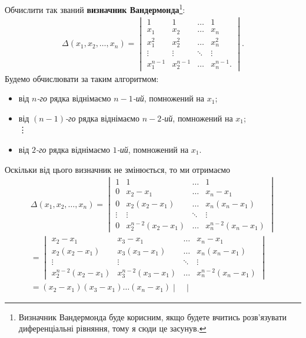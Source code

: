 \documentclass{math_library}
\begin{document}
\begin{example}
Обчислити так званий \textbf{визначник Вандермонда}\footnote{Визначник Вандермонда буде корисним, якщо будете вчитись розв'язувати диференціальні рівняння, тому я сюди це засунув.}:
\begin{align*}
\Delta (x_1,x_2,\dots,x_n) = \begin{vmatrix}
1 & 1 & \dots & 1 \\
x_1 & x_2 & \dots & x_n \\
x_1^2 & x_2^2 & \dots & x_n^2 \\
\vdots & \vdots & \ddots & \vdots \\
x_1^{n-1} & x_2^{n-1} & \dots & x_n^{n-1}.
\end{vmatrix}.
\end{align*}
Будемо обчислювати за таким алгоритмом:
\begin{itemize}[nosep,wide=0pt,label={--}]
\item від $n$\textit{-го} рядка віднімаємо $n-1$\textit{-ий}, помножений на $x_1$;
\item від $(n-1)$\textit{-го} рядка віднімаємо $n-2$\textit{-ий}, помножений на $x_1$;\\
\vdots
\item від $2$\textit{-го} рядка віднімаємо $1$\textit{-ий}, помножений на $x_1$.
\end{itemize}
Оскільки від цього визначник не змінюється, то ми отримаємо
\begin{multline*}
\Delta (x_1,x_2,\dots,x_n) = \begin{vmatrix}
1 & 1 & \dots & 1 \\
0 & x_2 - x_1 & \dots & x_n -x_1 \\
0 & x_2(x_2-x_1) & \dots & x_n(x_n-x_1) \\
\vdots & \vdots & \ddots & \vdots \\
0 & x_2^{n-2}(x_2-x_1) & \dots & x_n^{n-2}(x_n-x_1)
\end{vmatrix} \\
= \begin{vmatrix}
x_2 - x_1 & x_3 - x_1 & \dots & x_n -x_1 \\
x_2(x_2-x_1) & x_3(x_3-x_1) & \dots & x_n(x_n-x_1) \\
\vdots & \vdots & \ddots & \vdots \\
x_2^{n-2}(x_2-x_1) & x_3^{n-2}(x_3-x_1) & \dots & x_n^{n-2}(x_n-x_1)
\end{vmatrix} \\
= (x_2-x_1)(x_3-x_1) \dots (x_n-x_1) \begin{vmatrix}

\end{vmatrix}
\end{multline*}
\end{example}
\end{document}
